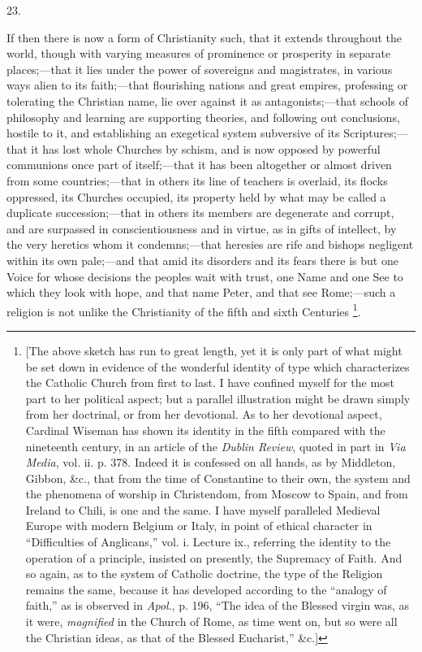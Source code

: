 23.

If then there is now a form of Christianity such, that it extends
throughout the world, though with varying measures of prominence or
prosperity in separate places;—that it lies under the power of
sovereigns and magistrates, in various ways alien to its faith;—that
flourishing nations and great empires, professing or tolerating the
Christian name, lie over against it as antagonists;—that schools of
philosophy and learning are supporting theories, and following out
conclusions, hostile to it, and establishing an exegetical system
subversive of its Scriptures;—that it has lost whole Churches by
schism, and is now opposed by powerful communions once part of itself;—that
it has been altogether or almost driven from some countries;—that in
others its line of teachers is overlaid, its flocks oppressed, its
Churches occupied, its property held by what may be called a duplicate
succession;—that in others its members are degenerate and corrupt,
and are surpassed in conscientiousness and in virtue, as in gifts of
intellect, by the very heretics whom it condemns;—that heresies are
rife and bishops negligent within its own pale;—and that amid its
disorders and its fears there is but one Voice for whose decisions the
peoples wait with trust, one Name and one See to which they look with
hope, and that name Peter, and that see Rome;—such a religion is not
unlike the Christianity of the fifth and sixth Centuries \footnote{[The above sketch has run to great
length, yet it is only part of what might be set down in evidence of
the wonderful identity of type which characterizes the Catholic Church
from first to last. I have confined myself for the most part to her
political aspect; but a parallel illustration might be drawn simply
from her doctrinal, or from her devotional. As to her devotional
aspect, Cardinal Wiseman has shown its identity in the fifth compared
with the nineteenth century, in an article of the \emph{Dublin Review},
quoted in part in \emph{Via Media}, vol. ii. p. 378. Indeed it is
confessed on all hands, as by Middleton, Gibbon, \&c., that from
the time of Constantine to their own, the system and the phenomena of
worship in Christendom, from Moscow to Spain, and from Ireland to
Chili, is one and the same. I have myself paralleled Medieval Europe
with modern Belgium or Italy, in point of ethical character in
``Difficulties of
Anglicans,'' vol. i. Lecture ix., referring
the identity to the operation of a principle, insisted on presently,
the Supremacy of Faith. And so again, as to the system of Catholic
doctrine, the type of the Religion remains the same, because it has
developed according to the ``analogy of faith,'' as is
observed in \emph{Apol}., p. 196, ``The idea of the Blessed virgin
was, as it were, \emph{magnified} in the Church of Rome, as time went
on, but so were all the Christian ideas, as that of the Blessed
Eucharist,'' \&c.]}.

